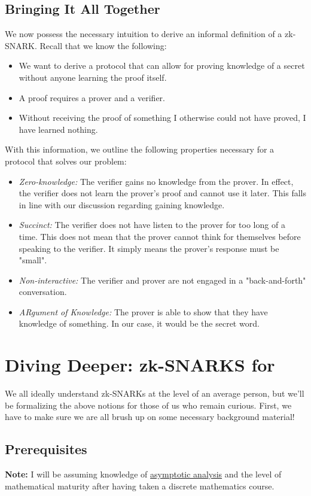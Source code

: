 \documentclass{article}
\begin{document}
\subsection{Bringing It All Together}
We now possess the necessary intuition to derive an informal definition of a zk-SNARK. Recall that we know the following:
\begin{itemize}
    \item We want to derive a protocol that can allow for proving knowledge of a secret without anyone learning the proof itself.
    \item A proof requires a prover and a verifier.
    \item Without receiving the proof of something I otherwise could not have proved, I have learned nothing.
\end{itemize}
With this information, we outline the following properties necessary for a protocol that solves our problem:
\begin{itemize}
    \item \textit{Zero-knowledge:} The verifier gains no knowledge from the prover. In effect, the verifier does not learn the prover's proof and cannot use it later. This falls in line with our discussion regarding gaining knowledge.
    \item \textit{Succinct:} The verifier does not have listen to the prover for too long of a time. This does not mean that the prover cannot think for themselves before speaking to the verifier. It simply means the prover's response must be "small".
    \item \textit{Non-interactive:} The verifier and prover are not engaged in a "back-and-forth" conversation.
    \item \textit{ARgument of Knowledge:} The prover is able to show that they have knowledge of something. In our case, it would be the secret word.
\end{itemize}

\section{Diving Deeper: zk-SNARKS for }
We all ideally understand zk-SNARKs at the level of an average person, but we'll be formalizing the above notions for those of us who remain curious. First, we have to make sure we are all brush up on some necessary background material!
\subsection{Prerequisites}
\textbf{Note:} I will be assuming knowledge of \href{https://en.wikipedia.org/wiki/Asymptotic_analysis}{asymptotic analysis} and the level of mathematical maturity after having taken a discrete mathematics course.
\end{document}
